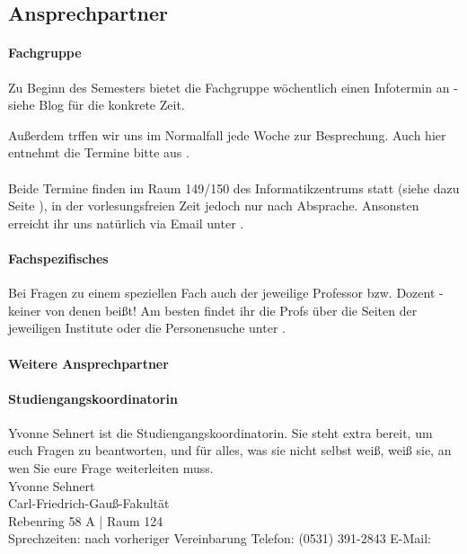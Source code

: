 
\subsection{Ansprechpartner}
\paragraph{Fachgruppe}
Zu Beginn des Semesters bietet die Fachgruppe wöchentlich einen Infotermin an - siehe Blog für die konkrete Zeit.

Außerdem trffen wir uns im Normalfall jede Woche zur
Besprechung. Auch hier entnehmt die Termine bitte aus
.
\\\\
Beide Termine finden im Raum 149/150 des Informatikzentrums statt
(siehe dazu Seite \pageref{campuskarte}), in der vorlesungsfreien Zeit
jedoch nur nach Absprache. Ansonsten erreicht ihr uns natürlich via
Email unter .

\paragraph{Fachspezifisches}
Bei Fragen zu einem speziellen Fach auch der jeweilige Professor
bzw. Dozent - keiner von denen beißt! Am besten findet ihr die Profs
über die Seiten der jeweiligen Institute oder die Personensuche unter
.
\paragraph{Weitere Ansprechpartner}
\paragraph{\small Studiengangskoordinatorin} Yvonne Sehnert ist die Studiengangskoordinatorin. Sie steht extra bereit,
um euch Fragen zu beantworten, und für alles, was sie nicht selbst
weiß, weiß sie, an wen Sie eure Frage weiterleiten muss.\\
{
Yvonne Sehnert\\
Carl-Friedrich-Gauß-Fakultät\\
Rebenring 58 A | Raum 124\\
Sprechzeiten: nach vorheriger Vereinbarung
Telefon: (0531) 391-2843
E-Mail: 
}

